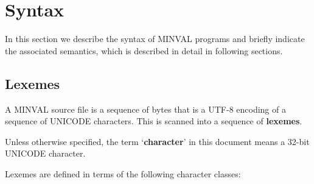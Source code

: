 \documentclass[12pt]{article}
\newcommand{\key}[1]{{\rm \bfseries #1}}
\newcommand{\skey}[2]{{\rm \bfseries #1#2}}
\begin{document}
\section{Syntax}

In this section we describe the syntax of MINVAL programs
and briefly indicate the associated semantics, which is
described in detail in following sections.

\subsection{Lexemes}
\label{LEXEMES}

A MINVAL source file is a sequence of bytes that is a UTF-8 encoding
of a sequence of UNICODE characters.  This is scanned into a sequence
of \skey{lexeme}s.

Unless otherwise specified, the term `\key{character}' in this
document means a 32-bit UNICODE character.

Lexemes are defined in terms of
the following character classes:
\end{document}
